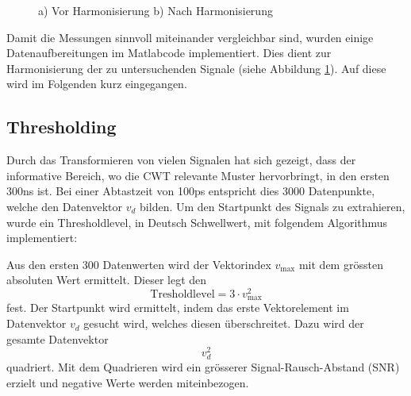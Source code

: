 \begin{refsection}
\begin{figure}
	\begin{subfigure}
		\centering
	\end{subfigure}
	\begin{subfigure}
		\centering
	\end{subfigure}	
\caption{a) Vor Harmonisierung b) Nach Harmonisierung}
\label{fig:Zeitsig}
\end{figure}

Damit die Messungen sinnvoll miteinander vergleichbar sind, wurden einige Datenaufbereitungen im Matlabcode implementiert.
Dies dient zur Harmonisierung der zu untersuchenden Signale (siehe Abbildung \ref{fig:Zeitsig}). 
Auf diese wird im Folgenden kurz eingegangen.

\subsection{Thresholding}
Durch das Transformieren von vielen Signalen hat sich gezeigt, dass der informative Bereich, wo die CWT relevante Muster hervorbringt, in den ersten 300ns ist.
Bei einer Abtastzeit von 100ps entspricht dies 3000 Datenpunkte, welche den Datenvektor $v_d$ bilden.
Um den Startpunkt des Signals zu extrahieren, wurde ein Thresholdlevel, in Deutsch Schwellwert, mit folgendem Algorithmus implementiert:

Aus den ersten 300 Datenwerten wird der Vektorindex $v_\text{max}$ mit dem grössten absoluten Wert ermittelt.
Dieser legt den
\begin{equation}
\text{Tresholdlevel} = 3\cdot v_\text{max}^2
\end{equation}
fest.
Der Startpunkt wird ermittelt, indem das erste Vektorelement im Datenvektor $v_d$ gesucht wird, welches diesen überschreitet.
Dazu wird der gesamte Datenvektor 
\begin{equation}
\text{$v_d^2$}
\end{equation}
quadriert.
Mit dem Quadrieren wird ein grösserer Signal-Rausch-Abstand (SNR) erzielt und negative Werte werden miteinbezogen.


\end{refsection}
